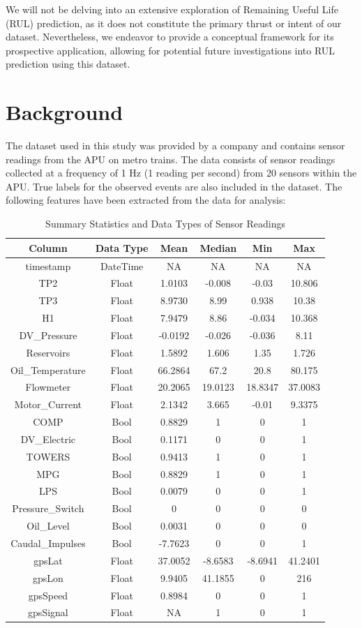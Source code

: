 \documentclass{article}
\begin{document}
We will not be delving into an extensive exploration of Remaining Useful Life (RUL) prediction, as it does not constitute the primary thrust or intent of our dataset. Nevertheless, we endeavor to provide a conceptual framework for its prospective application, allowing for potential future investigations into RUL prediction using this dataset.

\newpage

\section{Background}

The dataset used in this study was provided by a company and contains sensor readings from the APU on metro trains. The data consists of sensor readings collected at a frequency of 1 Hz (1 reading per second) from 20 sensors within the APU. True labels for the observed events are also included in the dataset. The following features have been extracted from the data for analysis:

\begin{table}[htbp]
\centering
\caption{Summary Statistics and Data Types of Sensor Readings}
\begin{tabular}{|c|c|c|c|c|c|}
\hline
Column & Data Type & Mean & Median & Min & Max \\
\hline
timestamp & DateTime & NA & NA & NA & NA \\
TP2 & Float & 1.0103 & -0.008 & -0.03 & 10.806 \\
TP3 & Float & 8.9730 & 8.99 & 0.938 & 10.38 \\
H1 & Float & 7.9479 & 8.86 & -0.034 & 10.368 \\
DV\_Pressure & Float & -0.0192 & -0.026 & -0.036 & 8.11 \\
Reservoirs & Float & 1.5892 & 1.606 & 1.35 & 1.726 \\
Oil\_Temperature & Float & 66.2864 & 67.2 & 20.8 & 80.175 \\
Flowmeter & Float & 20.2065 & 19.0123 & 18.8347 & 37.0083 \\
Motor\_Current & Float & 2.1342 & 3.665 & -0.01 & 9.3375 \\
COMP & Bool & 0.8829 & 1 & 0 & 1 \\
DV\_Electric & Bool & 0.1171 & 0 & 0 & 1 \\
TOWERS & Bool & 0.9413 & 1 & 0 & 1 \\
MPG & Bool & 0.8829 & 1 & 0 & 1 \\
LPS & Bool & 0.0079 & 0 & 0 & 1 \\
Pressure\_Switch & Bool & 0 & 0 & 0 & 0 \\
Oil\_Level & Bool & 0.0031 & 0 & 0 & 0 \\
Caudal\_Impulses & Bool & -7.7623 & 0 & 0 & 1 \\
gpsLat & Float & 37.0052 & -8.6583 & -8.6941 & 41.2401 \\
gpsLon & Float & 9.9405 & 41.1855 & 0 & 216 \\
gpsSpeed & Float & 0.8984 & 0 & 0 & 1 \\
gpsSignal & Float & NA & 1 & 0 & 1 \\
\hline
\end{tabular}
\end{table}
\end{document}
